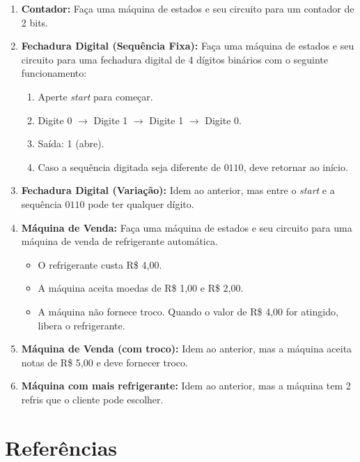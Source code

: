 \documentclass[12pt]{article}
\begin{document}
\begin{enumerate}[label=\textbf{\arabic*.}]
    \item \textbf{Contador:} Faça uma máquina de estados e seu circuito para um contador de 2 bits.

    \item \textbf{Fechadura Digital (Sequência Fixa):} Faça uma máquina de estados e seu circuito para uma fechadura digital de 4 dígitos binários com o seguinte funcionamento:
    \begin{enumerate}
        \item Aperte \textit{start} para começar.
        \item Digite 0 $\rightarrow$ Digite 1 $\rightarrow$ Digite 1 $\rightarrow$ Digite 0.
        \item Saída: 1 (abre).
        \item Caso a sequência digitada seja diferente de $0110$, deve retornar ao início.
    \end{enumerate}

    \item \textbf{Fechadura Digital (Variação):} Idem ao anterior, mas entre o \textit{start} e a sequência $0110$ pode ter qualquer dígito.

    \item \textbf{Máquina de Venda:} Faça uma máquina de estados e seu circuito para uma máquina de venda de refrigerante automática. 
    \begin{itemize}
        \item O refrigerante custa R\$ 4,00.
        \item A máquina aceita moedas de R\$ 1,00 e R\$ 2,00.
        \item A máquina não fornece troco. Quando o valor de R\$ 4,00 for atingido, libera o refrigerante.
    \end{itemize}

    \item \textbf{Máquina de Venda (com troco):} Idem ao anterior, mas a máquina aceita notas de R\$ 5,00 e deve fornecer troco.

    \item \textbf{Máquina com mais refrigerante:} Idem ao anterior, mas a máquina tem 2 refris que o cliente pode escolher.
    
\end{enumerate}

\newpage
\section{Referências}

\nocite{*}


\end{document}
